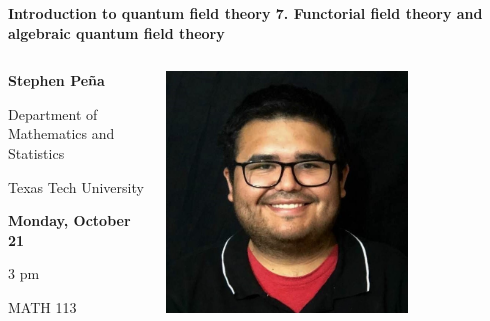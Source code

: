 \documentclass[compress,aspectratio=169]{beamer}
\date{}
\begin{document}
\begin{frame}[fragile]
\centering
\textbf{\huge
Introduction to quantum field theory 7.  Functorial field theory and algebraic quantum field theory}
\vspace{1em}
\begin{columns}
\begin{column}{0.55\textwidth}
\centering
\textbf{
}

\textbf{
\large
Stephen Peña
}

Department of Mathematics and Statistics

Texas Tech University

\vspace{2em}
\textbf{
Monday, October 21
}

3 pm

MATH 113

\end{column}
\begin{column}{0.45\textwidth}
\centering
\includegraphics[width=0.7\textwidth]{Pena_Stephen.jpg}

\end{column}
\end{columns}


\end{frame}
\end{document}
